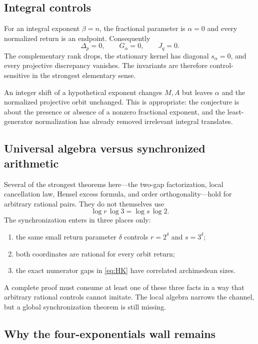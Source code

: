 \documentclass[11pt]{article}
\theoremstyle{definition}
\theoremstyle{remark}
\begin{document}
\subsection{Integral controls}

For an integral exponent $\beta=n$, the fractional parameter is $\alpha=0$ and every normalized return is an endpoint.  Consequently
\begin{equation}\label{eq:control-vanish}
 \Delta_p=0,
 \qquad
 G_\alpha=0,
 \qquad
 J_q=0.
\end{equation}
The complementary rank drops, the stationary kernel has diagonal $s_\alpha=0$, and every projective discrepancy vanishes.  The invariants are therefore control-sensitive in the strongest elementary sense.

An integer shift of a hypothetical exponent changes $M,A$ but leaves $\alpha$ and the normalized projective orbit unchanged.  This is appropriate: the conjecture is about the presence or absence of a nonzero fractional exponent, and the least-generator normalization has already removed irrelevant integral translates.

\subsection{Universal algebra versus synchronized arithmetic}

Several of the strongest theorems here---the two-gap factorization, local cancellation law, Hensel excess formula, and order orthogonality---hold for arbitrary rational pairs.  They do not themselves use
\begin{equation}\label{eq:sync-log}
 \log r\,\log3=\log s\,\log2.
\end{equation}
The synchronization enters in three places only:
\begin{enumerate}
\item the same small return parameter $\delta$ controls $r=2^\delta$ and $s=3^\delta$;
\item both coordinates are rational for every orbit return;
\item the exact numerator gaps in \eqref{eq:HK} have correlated archimedean sizes.
\end{enumerate}
A complete proof must consume at least one of these three facts in a way that arbitrary rational controls cannot imitate.  The local algebra narrows the channel, but a global synchronization theorem is still missing.

\subsection{Why the four-exponentials wall remains}
\end{document}
